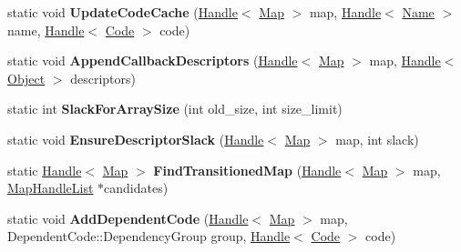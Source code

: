 \begin{DoxyCompactItemize}
\item 
static void {\bfseries Update\+Code\+Cache} (\hyperlink{classv8_1_1internal_1_1_handle}{Handle}$<$ \hyperlink{classv8_1_1internal_1_1_map}{Map} $>$ map, \hyperlink{classv8_1_1internal_1_1_handle}{Handle}$<$ \hyperlink{classv8_1_1internal_1_1_name}{Name} $>$ name, \hyperlink{classv8_1_1internal_1_1_handle}{Handle}$<$ \hyperlink{classv8_1_1internal_1_1_code}{Code} $>$ code)\hypertarget{classv8_1_1internal_1_1_map_a09a00a5fb21095e602a359e0a8b9411a}{}\label{classv8_1_1internal_1_1_map_a09a00a5fb21095e602a359e0a8b9411a}

\item 
static void {\bfseries Append\+Callback\+Descriptors} (\hyperlink{classv8_1_1internal_1_1_handle}{Handle}$<$ \hyperlink{classv8_1_1internal_1_1_map}{Map} $>$ map, \hyperlink{classv8_1_1internal_1_1_handle}{Handle}$<$ \hyperlink{classv8_1_1internal_1_1_object}{Object} $>$ descriptors)\hypertarget{classv8_1_1internal_1_1_map_ac5911c6113c1f350821c63f8a660d223}{}\label{classv8_1_1internal_1_1_map_ac5911c6113c1f350821c63f8a660d223}

\item 
static int {\bfseries Slack\+For\+Array\+Size} (int old\+\_\+size, int size\+\_\+limit)\hypertarget{classv8_1_1internal_1_1_map_ad40f689d7c12182e0084c11376c1a1c2}{}\label{classv8_1_1internal_1_1_map_ad40f689d7c12182e0084c11376c1a1c2}

\item 
static void {\bfseries Ensure\+Descriptor\+Slack} (\hyperlink{classv8_1_1internal_1_1_handle}{Handle}$<$ \hyperlink{classv8_1_1internal_1_1_map}{Map} $>$ map, int slack)\hypertarget{classv8_1_1internal_1_1_map_a56bc4d3d98d1fe0c04ef2cadb1774567}{}\label{classv8_1_1internal_1_1_map_a56bc4d3d98d1fe0c04ef2cadb1774567}

\item 
static \hyperlink{classv8_1_1internal_1_1_handle}{Handle}$<$ \hyperlink{classv8_1_1internal_1_1_map}{Map} $>$ {\bfseries Find\+Transitioned\+Map} (\hyperlink{classv8_1_1internal_1_1_handle}{Handle}$<$ \hyperlink{classv8_1_1internal_1_1_map}{Map} $>$ map, \hyperlink{classv8_1_1internal_1_1_list}{Map\+Handle\+List} $\ast$candidates)\hypertarget{classv8_1_1internal_1_1_map_a9508c43007fa9640e815785481e28ec6}{}\label{classv8_1_1internal_1_1_map_a9508c43007fa9640e815785481e28ec6}

\item 
static void {\bfseries Add\+Dependent\+Code} (\hyperlink{classv8_1_1internal_1_1_handle}{Handle}$<$ \hyperlink{classv8_1_1internal_1_1_map}{Map} $>$ map, Dependent\+Code\+::\+Dependency\+Group group, \hyperlink{classv8_1_1internal_1_1_handle}{Handle}$<$ \hyperlink{classv8_1_1internal_1_1_code}{Code} $>$ code)\hypertarget{classv8_1_1internal_1_1_map_a8b239f10d51127577073fa1216150b61}{}\label{classv8_1_1internal_1_1_map_a8b239f10d51127577073fa1216150b61}


\end{DoxyCompactItemize}
